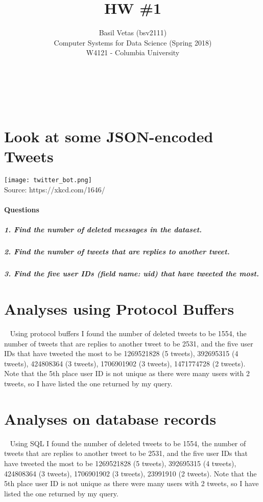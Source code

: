 \documentclass[12pt]{article}
\let\oldsection\section
\renewcommand\section{\clearpage\oldsection}
\begin{document}
 

\title{HW \#1}%
\author{Basil Vetas (bsv2111)\\ %
Computer Systems for Data Science (Spring 2018)\\
W4121 - Columbia University} %
\maketitle
~~~~~~~~~~~~~~~~~~~~~~~~~~~~~~~~~~~~~~~~~~~~~~~~~~~~~~~~~~~~~~~~~~~~~~~~~~~~~

\section{Look at some JSON-encoded Tweets}

\texttt{[image: twitter\_bot.png]}
\\Source: https://xkcd.com/1646/

\paragraph{Questions}

\subparagraph{1. Find the number of deleted messages in the dataset.}
\subparagraph{2. Find the number of tweets that are replies to another tweet.}
\subparagraph{3. Find the five user IDs (field name: uid) that have tweeted the most.}

\section{Analyses using Protocol Buffers} ~
Using protocol buffers I found the number of deleted tweets to be 1554, the number of tweets that are replies to another tweet to be 2531, and the five user IDs that have tweeted the most to be 1269521828 (5 tweets), 392695315 (4 tweets), 424808364 (3 tweets), 1706901902 (3 tweets), 1471774728 (2 tweets). Note that the 5th place user ID is not unique as there were many users with 2 tweets, so I have listed the one returned by my query.



\section{Analyses on database records} ~
Using SQL I found the number of deleted tweets to be 1554, the number of tweets that are replies to another tweet to be 2531, and the five user IDs that have tweeted the most to be 1269521828 (5 tweets), 392695315 (4 tweets), 424808364 (3 tweets), 1706901902 (3 tweets), 23991910 (2 tweets). Note that the 5th place user ID is not unique as there were many users with 2 tweets, so I have listed the one returned by my query.
\end{document}
